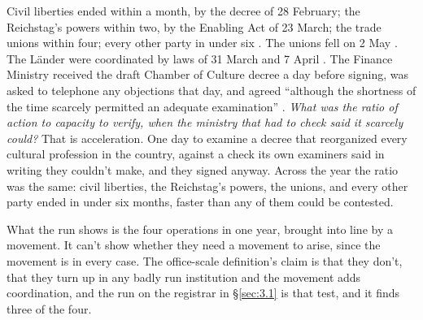 Civil liberties ended within a month, by the decree of 28 February; the Reichstag's powers within two, by the Enabling Act of 23 March; the trade unions within four; every other party in under six \autocite[435]{kershaw1999hubris}. The unions fell on 2 May \autocite[357]{evans2004coming}. The Länder were coordinated by laws of 31 March and 7 April \autocite{gleichschaltung1933a,gleichschaltung1933b}. The Finance Ministry received the draft Chamber of Culture decree a day before signing, was asked to telephone any objections that day, and agreed “although the shortness of the time scarcely permitted an adequate examination” \autocite[68–69]{dahm1986anfaenge}. \emph{What was the ratio of action to capacity to verify, when the ministry that had to check said it scarcely could?} That is acceleration. One day to examine a decree that reorganized every cultural profession in the country, against a check its own examiners said in writing they couldn't make, and they signed anyway. Across the year the ratio was the same: civil liberties, the Reichstag's powers, the unions, and every other party ended in under six months, faster than any of them could be contested.

What the run shows is the four operations in one year, brought into line by a movement. It can't show whether they need a movement to arise, since the movement is in every case. The office-scale definition's claim is that they don't, that they turn up in any badly run institution and the movement adds coordination, and the run on the registrar in \S\ref{sec:3.1} is that test, and it finds three of the four.
